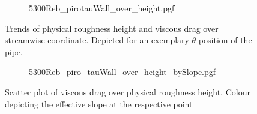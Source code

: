 \begin{figure}[h!]
    \centering
    \begin{subfigure}{0.75\textwidth}
        \centering
        {5300Reb_pirotauWall_over_height.pgf}
    \end{subfigure}
    \caption[Trends of physical roughness height and viscous drag over streamwise coordinate]{Trends of physical roughness height and viscous drag over streamwise coordinate. Depicted for an exemplary $\theta$ position of the pipe.}
    \label{fig: roughness height and viscous stress Reb 5300 piro}
\end{figure}
\begin{figure}
    \centering
    \begin{subfigure}{0.7\textwidth}
        \hspace{0.9cm}
        {5300Reb_piro_tauWall_over_height_bySlope.pgf}
    \end{subfigure}
    \caption[Scatter plot of viscous drag over physical roughness height]{Scatter plot of viscous drag over physical roughness height. Colour depicting the effective slope at the respective point}
    \label{fig: scatterplot piro Reb 5300}
\end{figure}

